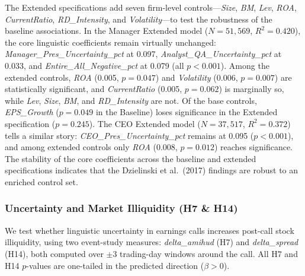 \documentclass[12pt,a4paper]{article}
\begin{document}
The Extended specifications add seven firm-level controls---\textit{Size}, \textit{BM}, \textit{Lev}, \textit{ROA}, \textit{CurrentRatio}, \textit{RD\_Intensity}, and \textit{Volatility}---to test the robustness of the baseline associations. In the Manager Extended model ($N = 51{,}569$, $R^2 = 0.420$), the core linguistic coefficients remain virtually unchanged: \textit{Manager\_Pres\_Uncertainty\_pct} at 0.097, \textit{Analyst\_QA\_Uncertainty\_pct} at 0.033, and \textit{Entire\_All\_Negative\_pct} at 0.079 (all $p < 0.001$). Among the extended controls, \textit{ROA} (0.005, $p = 0.047$) and \textit{Volatility} (0.006, $p = 0.007$) are statistically significant, and \textit{CurrentRatio} (0.005, $p = 0.062$) is marginally so, while \textit{Lev}, \textit{Size}, \textit{BM}, and \textit{RD\_Intensity} are not. Of the base controls, \textit{EPS\_Growth} ($p = 0.049$ in the Baseline) loses significance in the Extended specification ($p = 0.245$). The CEO Extended model ($N = 37{,}517$, $R^2 = 0.372$) tells a similar story: \textit{CEO\_Pres\_Uncertainty\_pct} remains at 0.095 ($p < 0.001$), and among extended controls only \textit{ROA} (0.008, $p = 0.012$) reaches significance. The stability of the core coefficients across the baseline and extended specifications indicates that the Dzielinski et al.\ (2017) findings are robust to an enriched control set.

\subsubsection{Uncertainty and Market Illiquidity (H7 \& H14)}
\label{sec:h7h14}

We test whether linguistic uncertainty in earnings calls increases post-call stock illiquidity, using two event-study measures: \textit{delta\_amihud} (H7) and \textit{delta\_spread} (H14), both computed over $\pm$3 trading-day windows around the call. All H7 and H14 $p$-values are one-tailed in the predicted direction ($\beta > 0$).
\end{document}
